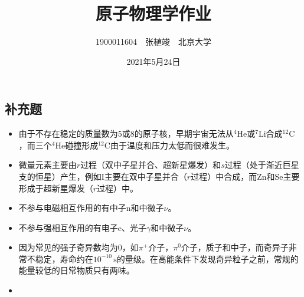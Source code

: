 \documentclass[a4paper,fontset=none]{ctexart}
\begin{document}
\title{\textbf{原子物理学作业}}
\author{1900011604\ \ 张植竣\ \ 北京大学}
\date{2021年5月24日}

\maketitle

\subsection*{补充题}

\begin{itemize}

\item[1.] 由于不存在稳定的质量数为5或8的原子核，早期宇宙无法从$^4\mathrm{He}$或$^7\mathrm{Li}$合成$^{12}\mathrm{C}$，而三个$^4\mathrm{He}$碰撞形成$^{12}\mathrm{C}$由于温度和压力太低而很难发生。

\item[2.] 微量元素主要由$r$过程（双中子星并合、超新星爆发）和$s$过程（处于渐近巨星支的恒星）产生，例如I主要在双中子星并合（$r$过程）中合成，而Zn和Se主要形成于超新星爆发（$r$过程）中。

\item[3.(1)] 不参与电磁相互作用的有中子n和中微子$\nu$。

\item[3.(2)] 不参与强相互作用的有电子e、光子$\gamma$和中微子$\nu$。

\item[4.] 因为常见的强子奇异数均为0，如$\pi^+$介子，$\pi^0$介子，质子和中子，而奇异子非常不稳定，寿命约在$10^{-10}\,\mathrm{s}$的量级。在高能条件下发现奇异粒子之前，常规的能量较低的日常物质只有两味。

\item[5.]

\end{itemize}
\end{document}
